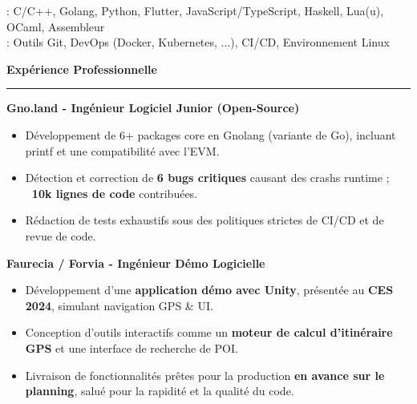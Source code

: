 \documentclass[9pt]{extarticle}
\begin{document}
\hspace*{5pt}{\bfseries Techniques}: C/C++, Golang, Python, Flutter, JavaScript/TypeScript, Haskell, Lua(u), OCaml, Assembleur
\\
\hspace*{5pt}{\bfseries Autres}: Outils Git, DevOps (Docker, Kubernetes, ...), CI/CD, Environnement Linux

\par\vspace{5pt}


{\large\bfseries Expérience Professionnelle}
\par\vspace{-8pt}
\rule{\linewidth}{0.4pt}
\par\vspace{5pt}

{\bfseries Gno.land - Ingénieur Logiciel Junior (Open-Source)}
\begin{itemize}[noitemsep, topsep=0pt]
	\item Développement de 6+ packages core en Gnolang (variante de Go), incluant printf et une compatibilité avec l'EVM.
	\item Détection et correction de {\bfseries 6 bugs critiques} causant des crashs runtime ; {\bfseries ~10k lignes de code} contribuées.
	\item Rédaction de tests exhaustifs sous des politiques strictes de CI/CD et de revue de code.
\end{itemize}

\par\vspace{5pt}

{\bfseries Faurecia / Forvia - Ingénieur Démo Logicielle}
\begin{itemize}[noitemsep, topsep=0pt]
	\item Développement d'une {\bfseries application démo avec Unity}, présentée au {\bfseries CES 2024}, simulant navigation GPS \& UI.
	\item Conception d'outils interactifs comme un {\bfseries moteur de calcul d'itinéraire GPS} et une interface de recherche de POI.
	\item Livraison de fonctionnalités prêtes pour la production {\bfseries en avance sur le planning}, salué pour la rapidité et la qualité du code.
\end{itemize}

\par\vspace{5pt}
\end{document}
